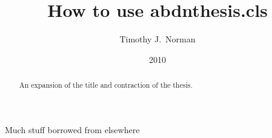 \documentclass[phd]{abdnthesis}
\title{How to use abdnthesis.cls}
\author{Timothy J.\ Norman}
\date{2010}
\begin{document}

\maketitle
\makedeclaration


\begin{abstract}
  An expansion of the title and contraction of the thesis.
\end{abstract}

\begin{acknowledgements}
  Much stuff borrowed from elsewhere
\end{acknowledgements}


\tableofcontents











\appendix



\end{document}

